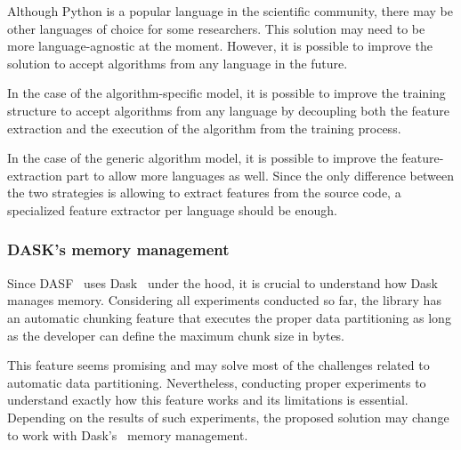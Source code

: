 Although Python is a popular language in the scientific community, there may be other languages of choice for some researchers.
This solution may need to be more language-agnostic at the moment.
However, it is possible to improve the solution to accept algorithms from any language in the future.

In the case of the algorithm-specific model, it is possible to improve the training structure to accept algorithms from any language by decoupling both the feature extraction and the execution of the algorithm from the training process.

In the case of the generic algorithm model, it is possible to improve the feature-extraction part to allow more languages as well.
Since the only difference between the two strategies is allowing to extract features from the source code, a specialized feature extractor per language should be enough.

\subsubsection{DASK's memory management}

Since \ac{DASF}~\cite{dasf} uses Dask~\cite{dask} under the hood, it is crucial to understand how Dask~\cite{dask} manages memory.
Considering all experiments conducted so far, the library has an automatic chunking feature that executes the proper data partitioning as long as the developer can define the maximum chunk size in bytes.

This feature seems promising and may solve most of the challenges related to automatic data partitioning.
Nevertheless, conducting proper experiments to understand exactly how this feature works and its limitations is essential.
Depending on the results of such experiments, the proposed solution may change to work with Dask's~\cite{dask} memory management.
